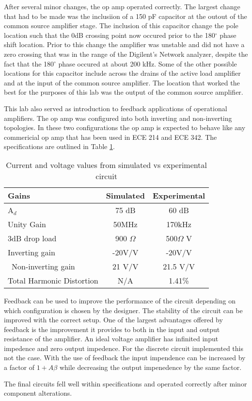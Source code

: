 
After several minor changes, the op amp operated correctly. The largest change that had to be made was the inclusiion of a 150 pF capacitor at the outout of the common source amplifier stage. The inclusion of this capacitor change the pole location such that the 0dB crossing point now occured prior to the 180$^\circ$ phase shift location. Prior to this change the amplifier was unstable and did not have a zero crossing that was in the range of the Digilent's Network analyzer, despite the fact that the 180$^\circ$ phase occured at about 200 kHz. Some of the other possible locations for this capacitor include across the drains of the active load amplifier and at the input of the common source amplifier. The location that worked the best for the purposes of this lab was the output of the common source amplifier.

 This lab also served as introduction to feedback applications of operational amplifiers. The op amp was configured into both inverting and non-inverting topologies. In these two configurations the op amp is expected to behave like any commericial op amp that has been used in ECE 214 and ECE 342. The specifications are outlined in Table \ref{tab:specs}.

\begin{table}[H]
	\centering
	\caption{Current and voltage values from simulated vs experimental circuit}
	\label{tab:specs}
	\begin{tabular}{|l|c|c|}                       
		\textbf{Gains} & Simulated & Experimental        \\ \hline
		A$_{d}$ & 75 dB      & 60 dB                                      \\ \hline
		Unity Gain &    50MHz      & 170kHz                    	   \\ \hline
		3dB drop load & 900 $\Omega$         & 500$\Omega$ V                              	       	       \\ \hline
		Inverting gain  & -20V/V                       &  -20V/V                        	   \\ \hline\
		Non-inverting gain & 21 V/V				& 21.5 V/V 	 \\ \hline
		Total Harmonic Distortion           & N/A         &    1.41\%                            \\ \hline
	

	\end{tabular}
\end{table}

Feedback can be used to improve the performance of the circuit depending on which configuration is chosen by the designer. The stability of the circuit can be improved with the correct setup. One of the largest advantages offered by feedback is the improvement it provides to both in the input and output resistance of the amplifier. An ideal voltage amplifier has infinited input impedence and zero output impedence. For the discrete circuit implemented this not the case. With the use of feedback the input impendence can be increased by a factor of $1+A\beta$ while decreasing the output impenedence by the same factor.

The final circuits fell well within specifications and operated correctly after minor component alterations.



